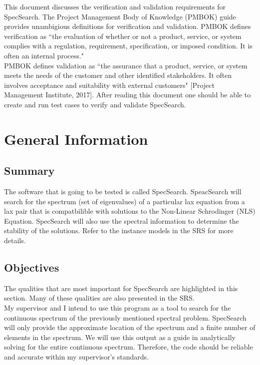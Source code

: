 \documentclass[12pt, titlepage]{article}
\begin{document}

This document discusses the verification and validation requirements for 
SpecSearch. The Project Management Body of Knowledge (PMBOK) guide provides 
unambigious definitions for verification and validation. PMBOK defines 
verification as ``the evaluation of whether or not a product, service, or 
system 
complies with a regulation, requirement, specification, or imposed condition. 
It is often an internal process." \\

PMBOK defines validation as ``the assurance that 
a product, service, or system meets the needs of the customer and other 
identified stakeholders. It often involves acceptance and suitability with 
external customers" [Project Management Institute, 2017]. After reading this 
document one should be able to create and run test cases to verify and validate 
SpecSearch. 

\section{General Information}

\subsection{Summary}

The software that is going to be tested is called SpecSearch. SpeacSearch will 
search for the 
spectrum (set of eigenvalues) of a particular lax equation from a lax pair that 
is compatbilible 
with solutions to the Non-Linear Schrodinger (NLS) Equation. SpecSearch will 
also use 
the spectral information to determine the stability of the solutions. Refer to 
the 
instance models in the SRS for more details.
\subsection{Objectives}

	The qualities that are most important for SpecSearch are highlighted in 
	this section. Many of these qualities are also presented in the SRS. \\
	
	My supervisor and I intend to use this program as a tool to search for the 
	continuous spectrum of the previously mentioned spectral problem. 
	SpecSearch 
	will only provide the approximate 
	location of the spectrum and a finite number of elements in the spectrum. 
	We will 
	use this output as a guide in analytically solving for the 
	entire continuous spectrum.  Therefore, the 
	code should be reliable and accurate within my supervisor's standards. \\
	
\end{document}
